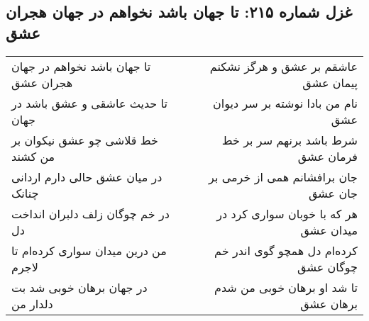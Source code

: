 \begin{center}
\section*{غزل شماره ۲۱۵: تا جهان باشد نخواهم در جهان هجران عشق}
\label{sec:215}
\begin{longtable}{l p{0.5cm} r}
تا جهان باشد نخواهم در جهان هجران عشق
&&
عاشقم بر عشق و هرگز نشکنم پیمان عشق
\\
تا حدیث عاشقی و عشق باشد در جهان
&&
نام من بادا نوشته بر سر دیوان عشق
\\
خط قلاشی چو عشق نیکوان بر من کشند
&&
شرط باشد برنهم سر بر خط فرمان عشق
\\
در میان عشق حالی دارم اردانی چنانک
&&
جان برافشانم همی از خرمی بر جان عشق
\\
در خم چوگان زلف دلبران انداخت دل
&&
هر که با خوبان سواری کرد در میدان عشق
\\
من درین میدان سواری کرده‌ام تا لاجرم
&&
کرده‌ام دل همچو گوی اندر خم چوگان عشق
\\
در جهان برهان خوبی شد بت دلدار من
&&
تا شد او برهان خوبی من شدم برهان عشق
\\
\end{longtable}
\end{center}

